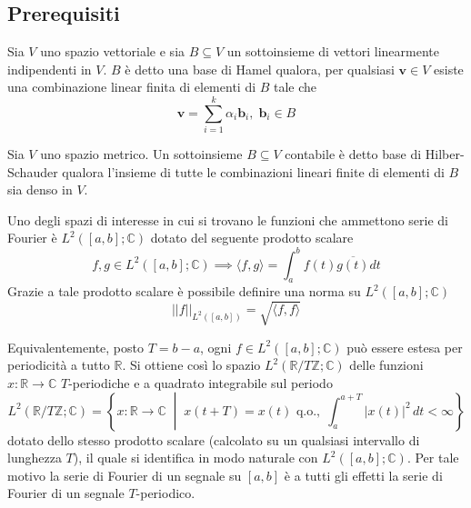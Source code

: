     \subsection{Prerequisiti}
        \begin{definition}
            Sia $V$ uno spazio vettoriale e sia $B \subseteq V$ un sottoinsieme di vettori linearmente indipendenti in $V$.
            $B$ è detto una base di Hamel qualora, per qualsiasi $\mathbf{v} \in V$ esiste una combinazione linear finita di elementi di $B$ tale che
            \[
                \mathbf{v} = \sum_{i = 1}^{k} \alpha_i \mathbf{b}_i, \; \mathbf{b}_i \in B
            \]
        \end{definition}

        \begin{definition}
            Sia $V$ uno spazio metrico. Un sottoinsieme $B \subseteq V$ contabile è detto base di Hilber-Schauder qualora l'insieme di tutte le combinazioni lineari finite di elementi di $B$
            sia denso in $V$.
        \end{definition}

        Uno degli spazi di interesse in cui si trovano le funzioni che ammettono serie di Fourier è $L^2([a, b]; \mathbb{C})$ dotato del seguente prodotto scalare
        \[
            f, g \in L^2([a, b]; \mathbb{C}) \implies \langle f, g \rangle = \int_{a}^{b} f(t) \overline{g(t)} dt
        \]
        Grazie a tale prodotto scalare è possibile definire una norma su $L^2([a, b]; \mathbb{C})$
        \[
            ||f||_{L^2([a, b])} = \sqrt{\langle f, f \rangle}
        \]

        Equivalentemente, posto $T = b - a$, ogni $f \in L^2([a, b]; \mathbb{C})$ può essere estesa per periodicità a tutto $\mathbb{R}$.
        Si ottiene così lo spazio $L^2(\mathbb{R}/T\mathbb{Z}; \mathbb{C})$ delle funzioni $x:\mathbb{R}\to\mathbb{C}$ $T$-periodiche e a quadrato integrabile sul periodo
        \[
            L^2(\mathbb{R}/T\mathbb{Z}; \mathbb{C}) = \left\{ x : \mathbb{R} \to \mathbb{C} \;\middle|\;
            x(t+T) = x(t) \text{ q.o.},\; \int_a^{a + T} |x(t)|^2\, dt < \infty \right\}
        \]
        dotato dello stesso prodotto scalare (calcolato su un qualsiasi intervallo di lunghezza $T$), il quale si identifica in modo naturale con $L^2([a, b]; \mathbb{C})$.
        Per tale motivo la serie di Fourier di un segnale su $[a, b]$ è a tutti gli effetti la serie di Fourier di un segnale $T$-periodico.\label{def:L2-periodic}

